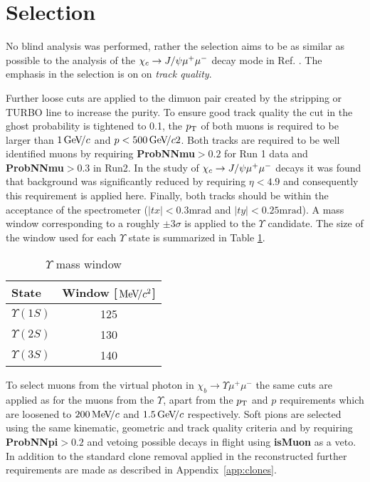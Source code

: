 \section{Selection}
\label{sec:selection}
No blind analysis was performed, rather the selection aims to be as similar as possible to the analysis of the ${\chi_{c}}
\rightarrow J/\psi \mu^+ \mu^-$ decay mode in Ref. \cite{Anderlini:2270922}. The
emphasis in the selection is on on \textit{track quality}.  

Further loose cuts are applied to the dimuon pair created by the stripping
or TURBO line to increase the purity. To ensure good track quality the
cut in the ghost probability is tightened to 0.1, the $p_{\mathrm{T}}$ of both
muons is required to be larger than $1 \text{\,Ge\kern -0.1em V\!/}c$ and $p < 500 \text{\,Ge\kern -0.1em V\!/}c2$.  Both tracks are required to be
well identified muons by requiring \textbf{ProbNNmu}$>0.2$ for Run 1
data and \textbf{ProbNNmu}$>0.3$ in Run2. In the study of ${\chi_{c}}
\rightarrow J/\psi \mu^+ \mu^-$ decays \cite{Anderlini:2270922} it was found that background
was significantly reduced by requiring $\eta < 4.9$ and consequently this
requirement is applied here.  Finally, both tracks should
be within the acceptance of the spectrometer ($|tx| < 0.3
\textrm{mrad}$ and $|ty| < 0.25 \textrm{mrad}$). A mass window
corresponding to a roughly $\pm 3 \sigma$ is applied to the $\Upsilon$
candidate. The size of the window used for each $\Upsilon$ state is
summarized in Table \ref{tab:umasscut}. 
\begin{table}[htb!]
\caption{\small $\Upsilon$ mass window }
\begin{center}
\begin{tabular}{l|c}
State & Window [$\text{\,Me\kern -0.1em V\!/}c^2$]  \\
\hline
$\Upsilon(1S)$ & 125 \\
$\Upsilon(2S)$ & 130 \\
$\Upsilon(3S)$ & 140 \\
\end{tabular}
\end{center}
\label{tab:umasscut}
\end{table}

To select muons from the virtual photon in $\chi_b \rightarrow
\Upsilon \mu^+ \mu^-$ the same cuts are applied as for the muons from
the $\Upsilon$, apart from the $p_{\mathrm{T}}$ and $p$ requirements which are
loosened to $200 \text{\,Me\kern -0.1em V\!/}c$ and $1.5 \text{\,Ge\kern -0.1em V\!/}c$ respectively. Soft pions are
selected using the same kinematic, geometric and track quality
criteria and by requiring  \textbf{ProbNNpi}$>0.2$ and vetoing
possible decays in flight using \textbf{isMuon} as a veto. In addition
to the standard clone removal applied in the reconstructed further
requirements are made as described in Appendix~\ref{app:clones}. 
 
